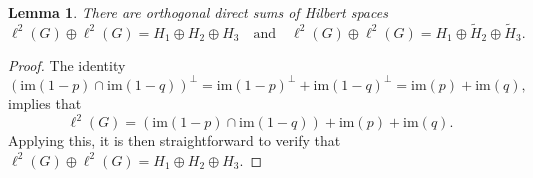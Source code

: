 \documentclass[a4paper,leqno,12pt]{article}
\numberwithin{equation}{section}
\theoremstyle{plain}
\newtheorem{lemma}[theoremcounter]{Lemma}
\theoremstyle{definition}
\theoremstyle{remark}
\begin{document}
	\begin{lemma}
		\label{lem:directsum}
		There are orthogonal direct sums of Hilbert spaces
		\[
			\ell^2(G)\oplus \ell^2(G) = H_1\oplus H_2\oplus H_3\quad \text{and} \quad
			\ell^2(G)\oplus \ell^2(G) = H_1\oplus \tilde H_2\oplus \tilde H_3.
		\]
	\end{lemma}
	
	\begin{proof}
		The identity $$(\mathrm{im}(1-p)\cap\mathrm{im}(1-q))^{\perp}=\mathrm{im}(1-p)^{\perp}+\mathrm{im}(1-q)^{\perp}=\mathrm{im}(p)+\mathrm{im}(q),$$
		implies that 
		\begin{equation}
			\label{eq:yeah}
			\ell^2(G)=(\mathrm{im}(1-p)\cap\mathrm{im}(1-q))+\mathrm{im}(p)+\mathrm{im}(q).
		\end{equation}
		Applying this, it is then straightforward to verify that $\ell^2(G)\oplus \ell^2(G)=H_1\oplus H_2\oplus H_3$.
		

\end{proof}
\end{document}
